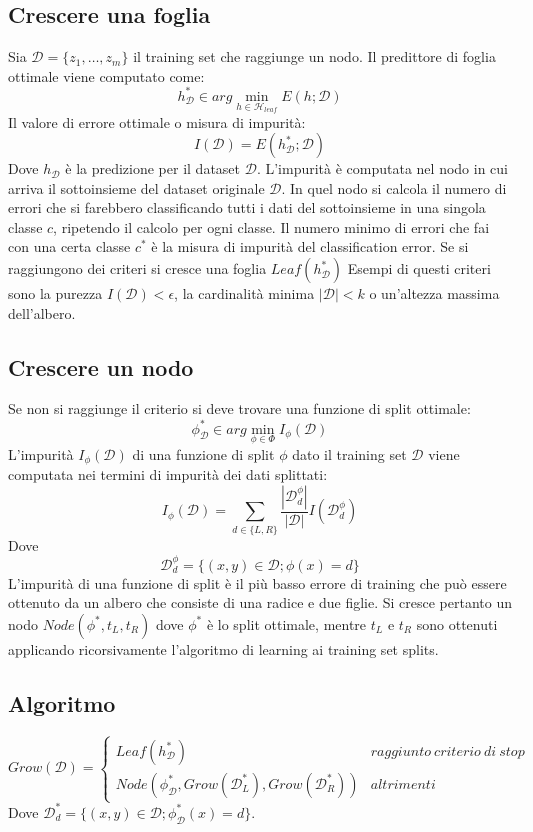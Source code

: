 	\subsection{Crescere una foglia}
	Sia $\mathcal{D}=\{z_1, \dots, z_m\}$ il training set che raggiunge un nodo.
	Il predittore di foglia ottimale viene computato come:
	$$h^*_\mathcal{D}\in arg\min\limits_{h\in\mathcal{H}_{leaf}} E(h; \mathcal{D})$$
	Il valore di errore ottimale o misura di impurit\`a:
	$$I(\mathcal{D}) = E(h^*_\mathcal{D};\mathcal{D})$$
	Dove $h_\mathcal{D}$ \`e la predizione per il dataset $\mathcal{D}$.
	L'impurit\`a \`e computata nel nodo in cui arriva il sottoinsieme del dataset originale $\mathcal{D}$.
	In quel nodo si calcola il numero di errori che si farebbero classificando tutti i dati del sottoinsieme in una singola classe $c$, ripetendo il calcolo per ogni classe.
	Il numero minimo di errori che fai con una certa classe $c^*$ \`e la misura di impurit\`a del classification error.
	Se si raggiungono dei criteri si cresce una foglia $Leaf(h^*_\mathcal{D})$
	Esempi di questi criteri sono la purezza $I(\mathcal{D}) < \epsilon$, la cardinalit\`a minima $|\mathcal{D}|<k$ o un'altezza massima dell'albero.

	\subsection{Crescere un nodo}
	Se non si raggiunge il criterio si deve trovare una funzione di split ottimale:
	$$\phi^*_\mathcal{D}\in arg\min\limits_{\phi\in\Phi}I_\phi(\mathcal{D})$$
	L'impurit\`a $I_\phi(\mathcal{D})$ di una funzione di split $\phi$ dato il training set $\mathcal{D}$ viene computata nei termini di impurit\`a dei dati splittati:
	$$I_\phi(\mathcal{D})=\sum\limits_{d\in\{L,R\}}\dfrac{|\mathcal{D}^\phi_d|}{|\mathcal{D}|}I(\mathcal{D}^\phi_d)$$
	Dove
	$$\mathcal{D}^\phi_d = \{(x, y)\in\mathcal{D};\phi(x)=d\}$$
	L'impurit\`a di una funzione di split \`e il pi\`u basso errore di training che pu\`o essere ottenuto da un albero che consiste di una radice e due figlie.
	Si cresce pertanto un nodo $Node(\phi^*, t_L, t_R)$ dove $\phi^*$ \`e lo split ottimale, mentre $t_L$ e $t_R$ sono ottenuti applicando ricorsivamente l'algoritmo di learning ai training set splits.

	\subsection{Algoritmo}
		$$Grow(\mathcal{D})=\begin{cases}Leaf(h^*_\mathcal{D}) &raggiunto\ criterio\ di\ stop\\
			 									 Node(\phi^*_\mathcal{D}, Grow(\mathcal{D}^*_L), Grow(\mathcal{D}^*_R)) &altrimenti
						\end{cases}$$
	Dove $\mathcal{D}^*_d=\{(x, y)\in\mathcal{D};\phi^*_\mathcal{D}(x)=d\}$.

